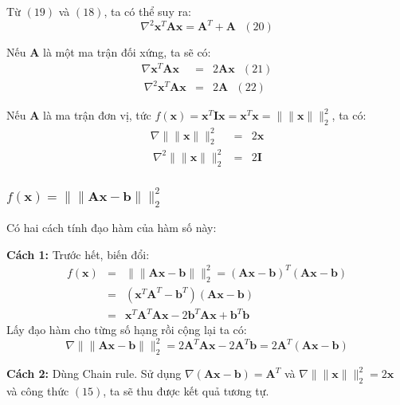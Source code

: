  
Từ $(19)$ và $(18)$, ta có thể suy ra: 
\begin{equation*} 
\nabla^2 \mathbf{x}^T\mathbf{Ax} = \mathbf{A}^T + \mathbf{A} ~~~ (20) 
\end{equation*} 
 
Nếu $\mathbf{A}$ là một ma trận đối xứng, ta sẽ có: 
\begin{eqnarray} 
\nabla \mathbf{x}^T\mathbf{A}\mathbf{x} &=& 2\mathbf{Ax}~~~(21)\\\ 
\nabla^2 \mathbf{x}^T\mathbf{Ax} &=& 2\mathbf{A} ~~~(22) 
\end{eqnarray} 
 
Nếu $\mathbf{A}$ là ma trận đơn vị, tức $f(\mathbf{x}) = \mathbf{x}^T\mathbf{Ix} = \mathbf{x}^T\mathbf{x} = \|\|\mathbf{x}\|\|_2^2$, ta có: 
\begin{eqnarray} 
\nabla \|\|\mathbf{x}\|\|_2^2 &=& 2\mathbf{x}\\\ 
\nabla^2 \|\|\mathbf{x}\|\|_2^2 &=& 2\mathbf{I} 
\end{eqnarray} 
 
 
\subsubsection{$f(\mathbf{x}) = \|\|\mathbf{Ax} - \mathbf{b}\|\|_2^2 $}
Có hai cách tính đạo hàm của hàm số này: 
 
\textbf{Cách 1:} 
Trước hết, biến đổi: 
\begin{eqnarray} 
f(\mathbf{x}) &=& \|\|\mathbf{Ax} - \mathbf{b}\|\|_2^2 = (\mathbf{Ax} - \mathbf{b})^T(\mathbf{Ax} - \mathbf{b}) \\\ 
&=& (\mathbf{x}^T\mathbf{A}^T - \mathbf{b}^T) (\mathbf{Ax} - \mathbf{b}) \\\ 
&=& \mathbf{x}^T\mathbf{A}^T\mathbf{Ax} - 2 \mathbf{b}^T\mathbf{Ax} + \mathbf{b}^T\mathbf{b} 
\end{eqnarray} 
Lấy đạo hàm cho từng số hạng rồi cộng lại ta có:  
\begin{equation*} 
\nabla \|\|\mathbf{Ax} - \mathbf{b}\|\|_2^2 = 2\mathbf{A}^T\mathbf{A}\mathbf{x} - 2\mathbf{A}^T\mathbf{b} = 2\mathbf{A}^T(\mathbf{Ax} - \mathbf{b}) 
\end{equation*} 
 
\textbf{Cách 2:} Dùng Chain rule. 
Sử dụng $\nabla (\mathbf{Ax} - \mathbf{b}) = \mathbf{A}^T$ và $\nabla \|\|\mathbf{x}\|\|_2^2 = 2\mathbf{x}$ và công thức $(15)$, ta sẽ thu được kết quả tương tự.  
 
 
